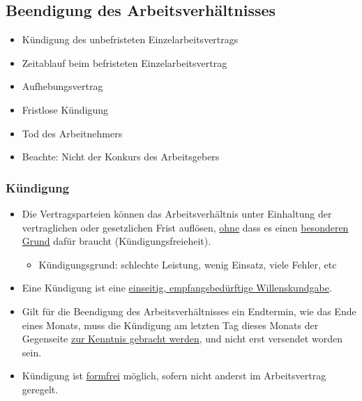 \subsection{Beendigung des Arbeitsverhältnisses}
\begin{minipage}{0.5\linewidth}
    \begin{itemize}
        \item Kündigung des unbefristeten Einzelarbeitsvertrags
        \item Zeitablauf beim befristeten Einzelarbeitsvertrag
        \item Aufhebungsvertrag
    \end{itemize}
\end{minipage}
\begin{minipage}{0.5\linewidth}
    \begin{itemize}
        \setcounter{enumi}{4}
        \item Fristlose Kündigung
        \item Tod des Arbeitnehmers
        \item Beachte: Nicht der Konkurs des Arbeitsgebers
    \end{itemize}
\end{minipage}

\subsubsection{Kündigung}
\begin{itemize}
    \item Die Vertragsparteien können das Arbeitsverhältnis unter Einhaltung der vertraglichen oder gesetzlichen Frist auflösen, \underline{ohne} dass es einen \underline{besonderen Grund} dafür braucht (Kündigungsfreieheit).
    \begin{itemize}
        \item Kündigungsgrund: schlechte Leistung, wenig Einsatz, viele Fehler, etc
    \end{itemize}
    \item Eine Kündigung ist eine \underline{einseitig, empfangsbedürftige Willenskundgabe}.
    \item Gilt für die Beendigung des Arbeitsverhältnisses ein Endtermin, wie das Ende eines Monats, muss die Kündigung am letzten Tag dieses Monats der Gegenseite \underline{zur Kenntnis gebracht werden}, und nicht erst versendet worden sein.
    \item Kündigung ist \underline{formfrei} möglich, sofern nicht anderst im Arbeitsvertrag geregelt.
\end{itemize}

